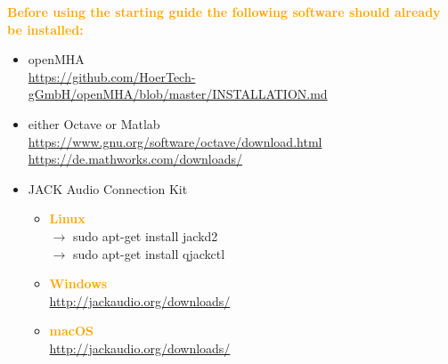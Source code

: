 \documentclass[11pt,a4paper,twoside]{article}
\newcommand{\+}{\discretionary{\mbox{\scriptsize$\hookleftarrow$}}{}{}}
\begin{document}
\textcolor{orange}{\textbf{Before using the starting guide the following software should already be installed:}}

\begin{itemize}
   \item \large{{openMHA}}   \\
     \footnotesize{\url{https://github.com/HoerTech-gGmbH/openMHA/blob/master/INSTALLATION.md}}
   \item \large{{either Octave or Matlab}}    \\
     \footnotesize{\url{https://www.gnu.org/software/octave/download.html}} \\
     \footnotesize{\url{https://de.mathworks.com/downloads/}}
   \item \large{{JACK Audio Connection Kit}}
   \begin{itemize}
   \item \textcolor{orange}{\textbf{Linux}} \\
   $\rightarrow$ {\ttfamily sudo apt-get install jackd2} \\
   $\rightarrow$ {\ttfamily sudo apt-get install qjackctl}
   \item \textcolor{orange}{\textbf{Windows}} \\
   \footnotesize{\url{http://jackaudio.org/downloads/}}
   \item \textcolor{orange}{\textbf{\large{macOS}}} \\
   \footnotesize{\url{http://jackaudio.org/downloads/}} %
   \end{itemize}
\end{itemize}

\end{document}
